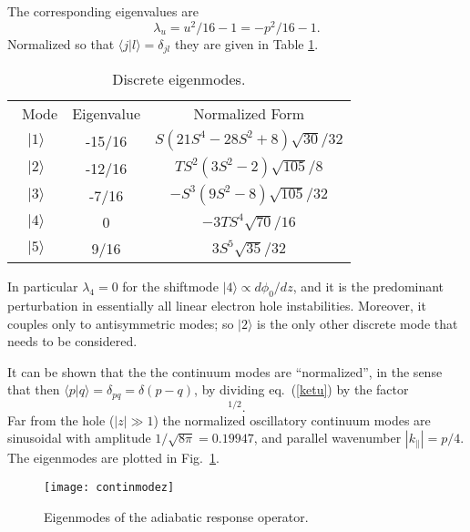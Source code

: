 \documentclass{jpp}
\def\ket#1{|#1\rangle}
\def\bra#1{\langle#1}
\begin{document}
The corresponding eigenvalues are
\begin{equation}
  \label{eigenvalues}
  \lambda_u= u^2/16-1=-p^2/16-1.
\end{equation}
Normalized so that
$\bra{j}\ket{l}=\delta_{jl}$ they are given in Table \ref{discrete}. 
\begin{table}
  \center
\begin{tabular}{ccc}\
  Mode & Eigenvalue & Normalized Form\\
  $\ket{1}$& -15/16&$S(21S^4 - 28S^2 + 8)\sqrt{30}/32$\\
  $\ket{2}$& -12/16&$TS^2(3S^2 - 2)\sqrt{105}/8$\\
  $\ket{3}$& -7/16 &$-S^3(9S^2 - 8)\sqrt{105}/32 $\\
  $\ket{4}$&  0 &$-3TS^4\sqrt{70}/16 $\\
  $\ket{5}$&  9/16 &$3S^5\sqrt{35}/32 $\\
\end{tabular}
\caption{Discrete eigenmodes.\label{discrete}}
\end{table}
\noindent
In particular $\lambda_4=0$ for the shiftmode
$\ket{4}\propto d\phi_0/dz$, and it is the predominant perturbation in
essentially all linear electron hole instabilities. Moreover, it
couples only to antisymmetric modes; so $\ket{2}$ is the only other
discrete mode that needs to be considered.

It can
be shown that the the continuum modes are ``normalized'', in the sense
that then $\bra{p}\ket{q}=\delta_{pq}=\delta(p-q)$, by dividing eq.\
(\ref{ketu}) by the factor
\begin{equation}
  [8\pi(p^2+1^2)(p^2+2^2)(p^2+3^2)(p^2+4^2)(p^2+5^2)]^{1/2}.
  \label{normfactor}
\end{equation}
Far
from the hole ($|z|\gg1$) the normalized oscillatory continuum modes are
sinusoidal with amplitude $1/\sqrt{8\pi}=0.19947$, and parallel wavenumber
$|k_\parallel|=p/4$. The eigenmodes are plotted in Fig.\
\ref{modeplots}.
\begin{figure}\center
  \texttt{[image: continmodez]}
  \caption{Eigenmodes of the adiabatic response operator.\label{modeplots}}
\end{figure}
\end{document}
